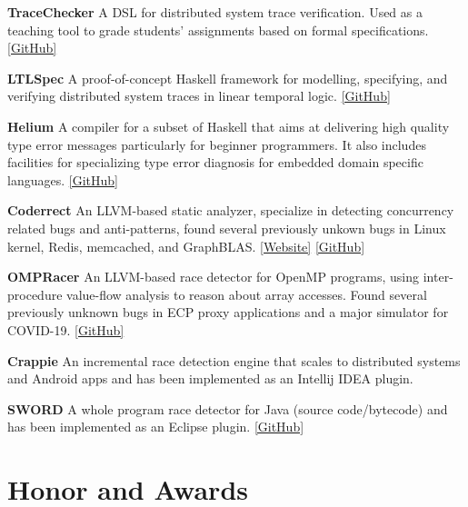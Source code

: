 \documentclass[12pt,letterpaper]{report}
\newcommand{\listtabwidth}{1.75cm}
\begin{document}
\begin{tablist}
	\item[\textbf{TraceChecker}]
	\tab A DSL for distributed system trace verification. Used as a teaching tool to grade students' assignments based on formal specifications.
	\href{https://github.com/DistributedClocks/TraceChecker}{[GitHub]}
	\item[\textbf{LTLSpec}]
	\tab A proof-of-concept Haskell framework for modelling, specifying, and verifying distributed system traces in linear temporal logic.
	\href{https://github.com/ejconlon/ltlspec}{[GitHub]}
	\item[\textbf{Helium}]
	\tab A compiler for a subset of Haskell that aims at delivering high quality type error messages particularly for beginner programmers. It also includes facilities for specializing type error diagnosis for embedded domain specific languages. \href{https://github.com/Helium4Haskell/helium}{[GitHub]}
	\item[\textbf{Coderrect}]
	\tab An LLVM-based static analyzer, specialize in detecting concurrency related bugs and anti-patterns, found several previously unkown bugs in Linux kernel, Redis, memcached, and GraphBLAS. \href{https://coderrect.com/}{[Website]} \href{https://github.com/jtao/OpenRace}{[GitHub]}
	\item[\textbf{OMPRacer}]
	\tab An LLVM-based race detector for OpenMP programs,
	using inter-procedure value-flow analysis to reason about array accesses.
	Found several previously unknown bugs in ECP proxy applications and a major simulator for COVID-19. \href{https://github.com/parasol-aser/OMPRacer}{[GitHub]}
	\item[\textbf{Crappie}]
	\tab An incremental race detection engine that scales to distributed systems and Android apps and has been implemented as an Intellij IDEA plugin.
	\item[\textbf{SWORD}]
	\tab A whole program race detector for Java (source code/bytecode) and has been implemented as an Eclipse plugin. \href{https://github.com/funemy/SWORD}{[GitHub]}
\end{tablist}
\renewcommand{\listtabwidth}{1.75cm}

\vspace{-0.5em}
\section*{Honor and Awards}
\end{document}
